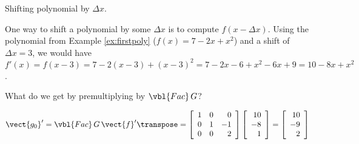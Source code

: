 
\begin{example}
 Shifting polynomial by $\Delta x$.
\end{example}

One way to shift a polynomial by some $\Delta x$ is to compute $f(x - \Delta x)$.
Using the polynomial from Example \ref{ex:firstpoly} ($f(x)= 7 - 2x + x^2$) and a shift of $\Delta x = 3$, we would have $f'(x) = f(x-3) = 7 - 2 (x-3) + (x-3)^2 = 7 - 2x - 6 + x^2 - 6x + 9 = 10 - 8x + x^2$.

What do we get by premultiplying by $\vbl{Fac}\,G$?

\[
 \vect{g_0}' =
\vbl{Fac}\,G\,{\vect{f}'} \transpose =
 \left[\begin{array}{rrr}
   1 & 0 &  0 \\
   0 & 1 & -1 \\
   0 & 0 &  2 \\
 \end{array}\right]
 \left[\begin{array}{r}
   10 \\ -8 \\ 1 \\
 \end{array}\right]
 =
 \left[\begin{array}{r}
   10 \\ -9 \\ 2 \\
 \end{array}\right]
\]



